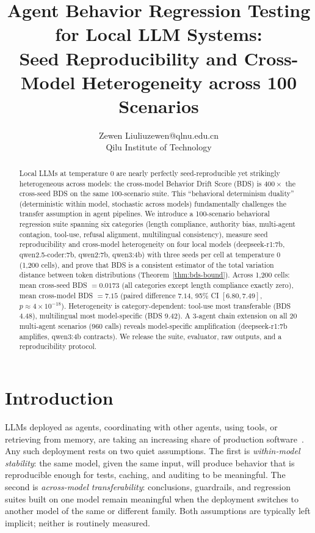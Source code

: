 \documentclass[11pt]{article}
\title{Agent Behavior Regression Testing for Local LLM Systems:\\Seed Reproducibility and Cross-Model Heterogeneity across 100 Scenarios}
\author{\name Zewen Liu\email liuzewen@qlnu.edu.cn\\\addr Qilu Institute of Technology}  %
\date{}
\begin{document}
\maketitle

\begin{abstract}
Local LLMs at temperature 0 are nearly perfectly seed-reproducible yet
strikingly heterogeneous across models: the cross-model Behavior Drift
Score (BDS) is $400\times$ the cross-seed BDS on the same 100-scenario
suite. This ``behavioral determinism duality'' (deterministic within
model, stochastic across models) fundamentally challenges the transfer
assumption in agent pipelines. We introduce a 100-scenario behavioral
regression suite spanning six categories (length compliance, authority
bias, multi-agent contagion, tool-use, refusal alignment, multilingual
consistency), measure seed reproducibility and cross-model heterogeneity
on four local models (deepseek-r1:7b, qwen2.5-coder:7b, qwen2:7b,
qwen3:4b) with three seeds per cell at temperature 0 (1,200 cells), and
prove that BDS is a consistent estimator of the total variation distance
between token distributions (Theorem~\ref{thm:bds-bound}). Across 1,200
cells: mean cross-seed BDS $= 0.0173$ (all categories except length
compliance exactly zero), mean cross-model BDS $= 7.15$ (paired
difference $7.14$, 95\% CI $[6.80, 7.49]$, $p \approx 4\times10^{-18}$).
Heterogeneity is category-dependent: tool-use most transferable (BDS
$4.48$), multilingual most model-specific (BDS $9.42$). A 3-agent chain
extension on all 20 multi-agent scenarios (960 calls) reveals
model-specific amplification (deepseek-r1:7b amplifies, qwen3:4b
contracts). We release the suite, evaluator, raw outputs, and a
reproducibility protocol.
\end{abstract}

\section{Introduction}
\label{sec:intro}

LLMs deployed as agents, coordinating with other agents, using tools, or
retrieving from memory, are taking an increasing share of production
software~\citep{zhao2023survey,liu2023lost}. Any such deployment rests on
two quiet assumptions. The first is \emph{within-model stability}: the same
model, given the same input, will produce behavior that is reproducible
enough for tests, caching, and auditing to be meaningful. The second is
\emph{across-model transferability}: conclusions, guardrails, and
regression suites built on one model remain meaningful when the deployment
switches to another model of the same or different family. Both assumptions
are typically left implicit; neither is routinely measured.
\end{document}
